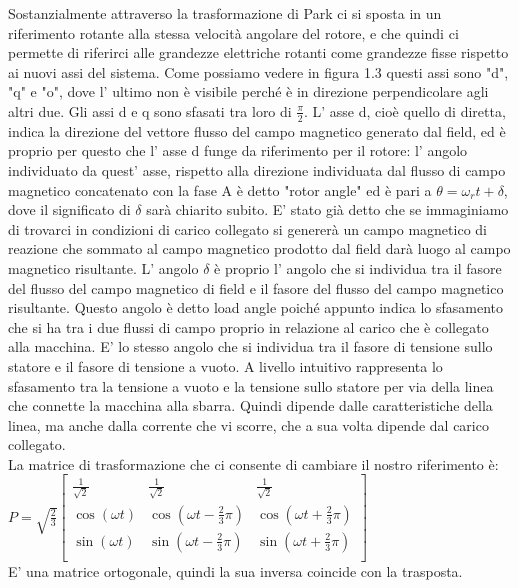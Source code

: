 \documentclass[Lau,noexaminfo]{sapthesis}
\begin{document}
	Sostanzialmente attraverso la trasformazione di Park ci si sposta in un riferimento rotante alla stessa velocità angolare del rotore, e che quindi ci permette di riferirci alle grandezze elettriche rotanti come grandezze fisse rispetto ai nuovi assi del sistema. Come possiamo vedere in figura 1.3 questi assi sono "d", "q" e "o", dove l' ultimo non è visibile perché è in direzione perpendicolare agli altri due. Gli assi d e q sono sfasati tra loro di $\frac{\pi}{2}$. L' asse d, cioè quello di diretta, indica la direzione del vettore flusso del campo magnetico generato dal field, ed è proprio per questo che l' asse d funge da riferimento per il rotore: l' angolo individuato da quest' asse, rispetto alla direzione individuata dal flusso di campo magnetico concatenato con la fase A è detto "rotor angle" ed è pari a $\theta=\omega_r t+\delta $, dove il significato di $\delta$ sarà chiarito subito. E' stato già detto che se immaginiamo di trovarci in condizioni di carico collegato si genererà un campo magnetico di reazione che sommato al campo magnetico prodotto dal field darà luogo al campo magnetico risultante. L' angolo $\delta$ è proprio l' angolo che si individua tra il fasore del flusso del campo magnetico di field e il fasore del flusso del campo magnetico risultante. Questo angolo è detto load angle poiché appunto indica lo sfasamento che si ha tra i due flussi di campo proprio in relazione al carico che è collegato alla macchina. E' lo stesso angolo che si individua tra il fasore di tensione sullo statore e il fasore di tensione a vuoto. A livello intuitivo rappresenta lo sfasamento tra la tensione a vuoto e la tensione sullo statore per via della linea che connette la macchina alla sbarra. Quindi dipende dalle caratteristiche della linea, ma anche dalla corrente che vi scorre, che a sua volta dipende dal carico collegato.\\
	La matrice di trasformazione che ci consente di cambiare il nostro riferimento è:\\
	$P=\sqrt{\frac{2}{3}}\begin{bmatrix}
		\frac{1}{\sqrt2} & \frac{1}{\sqrt2} & \frac{1}{\sqrt2} \\
		\cos(\omega t) & \cos(\omega t -\frac{2}{3}\pi) & \cos(\omega t +\frac{2}{3}\pi) \\
		\sin(\omega t) & \sin(\omega t -\frac{2}{3}\pi) & \sin(\omega t +\frac{2}{3}\pi) \\
		
	\end{bmatrix}$\\
	E' una matrice ortogonale, quindi la sua inversa coincide con la trasposta.
\end{document}
